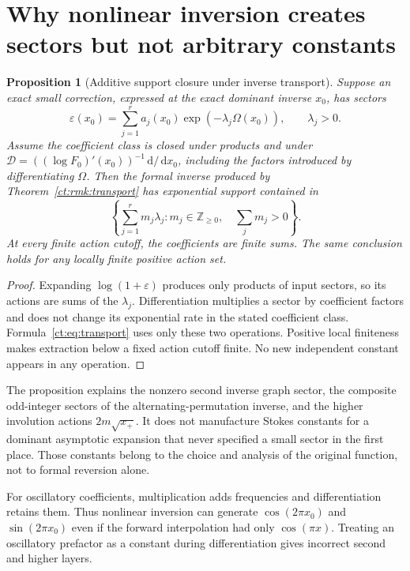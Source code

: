 \documentclass[11pt,openany]{book}
\numberwithin{equation}{chapter}
\theoremstyle{plain}
\newtheorem{proposition}[theorem]{Proposition}
\theoremstyle{definition}
\theoremstyle{remark}
\newcommand{\dd}{\,\mathrm d}                 %
\begin{document}
\section{Why nonlinear inversion creates sectors but not arbitrary constants}

\begin{proposition}[Additive support closure under inverse transport]
\label{t2:prop:support}
Suppose an exact small correction, expressed at the exact dominant inverse $x_0$, has sectors
\[
 \varepsilon(x_0)=\sum_{j=1}^r
       a_j(x_0)\exp(-\lambda_j\Omega(x_0)),\qquad\lambda_j>0.
\]
Assume the coefficient class is closed under products and under
$\mathcal D=((\log F_0)'(x_0))^{-1}\dd/\dd x_0$, including the factors introduced by differentiating $\Omega$. Then the formal inverse produced by Theorem~\ref{ct:rmk:transport} has exponential support contained in
\[
 \left\{\sum_{j=1}^rm_j\lambda_j:
              m_j\in\mathbb Z_{\ge0},\quad\sum_jm_j>0\right\}.
\]
At every finite action cutoff, the coefficients are finite sums. The same conclusion holds for any locally finite positive action set.
\end{proposition}
\begin{proof}
Expanding $\log(1+\varepsilon)$ produces only products of input sectors, so its actions are sums of the $\lambda_j$. Differentiation multiplies a sector by coefficient factors and does not change its exponential rate in the stated coefficient class. Formula~\eqref{ct:eq:transport} uses only these two operations. Positive local finiteness makes extraction below a fixed action cutoff finite. No new independent constant appears in any operation.
\end{proof}

The proposition explains the nonzero second inverse graph sector, the composite odd-integer sectors of the alternating-permutation inverse, and the higher involution actions $2m\sqrt{x_+}$. It does not manufacture Stokes constants for a dominant asymptotic expansion that never specified a small sector in the first place. Those constants belong to the choice and analysis of the original function, not to formal reversion alone.

For oscillatory coefficients, multiplication adds frequencies and differentiation retains them. Thus nonlinear inversion can generate $\cos(2\pi x_0)$ and $\sin(2\pi x_0)$ even if the forward interpolation had only $\cos(\pi x)$. Treating an oscillatory prefactor as a constant during differentiation gives incorrect second and higher layers.
\end{document}
